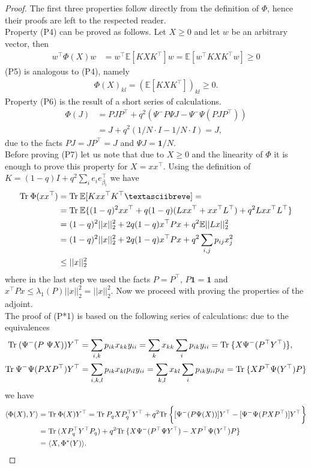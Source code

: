 \documentclass[a4paper,12pt]{article}
\def\tr{\mathrm{Tr}\hspace{0.8mm}}
\begin{document}
\begin{proof}
	The first three properties follow directly from the definition of $\Phi$, hence their proofs are left to the respected reader. \\
	Property (P4) can be proved as follows. Let $X\geq 0$ and let $w$ be an arbitrary vector, then
	\begin{align*}
		w^\top\Phi(X)w &= w^\top\mathbb E[KXK^\top] w= \mathbb E[w^\top K X K^\top w] \geq 0
	\end{align*}
	(P5) is analogous to (P4), namely
	\begin{align*}
		\Phi(X)_{kl}  = (\mathbb E[KXK^\top])_{kl}  \geq 0.
	\end{align*}
	Property (P6) is the result of a short series of calculations.
	\begin{align*}
		\Phi(J) &= PJP^\top + q^2(\Psi^- P\Psi J - \Psi^-\Psi(PJP^\top)) \\
		& = J + q^2(1/N\cdot I - 1/N\cdot I) = J,
	\end{align*}
	due to the facts $PJ = JP^\top = J$ and $\Psi J =  \mathbf1/N $. \\
	Before proving (P7) let us note that due to $X\geq0$ and the linearity of $\Phi$ it is enough to prove this property for $X=xx^\top$. Using the definition of $K = (1-q)I + q^2 \sum_i e_i e_{\beta_i}^\top$ we have
	\begin{align*}
		\tr\Phi(xx^\top)& = \tr\mathbb E[Kxx^\top K^\top ˘] =\\
		&=\tr \mathbb E\{(1-q)^2 xx^\top + q(1-q)(Lxx^\top + xx^\top L^\top) + q^2Lxx^\top L^\top \} \\
		&= (1-q)^2||x||_2^2 + 2q(1-q) x^\top P x +q^2\mathbb E ||Lx||_2^2 \\
		& = (1-q)^2||x||_2^2 + 2q(1-q) x^\top P x + q^2\sum_{i,j} p_{ij} x_j^2\\
		& \leq  ||x||^2_2
	\end{align*}
	where in the last step we used the facts $P=P^\top$, $P\mathbf 1 = \mathbf 1$ and $x^\top P x \leq \lambda_1(P) ||x||_2^2 = ||x||_2^2 $.
	Now we proceed with proving the properties of the adjoint.\\
	The proof of (P*1) is based on the following series of calculations:
	due to the equivalences
	\begin{align*}
		\tr (\Psi^-(P\ \Psi X ))  Y^\top& =  \sum_{i,k} p_{ik}x_{kk} y_{ii} = \sum_{k} x_{kk} \sum_i p_{ik}y_{ii} = \tr \{X \Psi^-(P^\top Y^\top)\} ,\\
		\tr \Psi^-\Psi(PXP^\top) Y^\top &= \sum_{i,k,l} p_{ik}x_{kl}p_{il}y_{ii} = \sum_{k,l} x_{kl} \sum_i p_{ik}y_{ii}p_{il} = \tr \{X P^\top \Psi(Y^\top) P\}
	\end{align*}
	we have
	\begin{align*}
		\langle \Phi(X), Y \rangle &= \tr \Phi(X)Y^\top = \tr P_qXP_q^\top Y^\top  + q^2\tr \bigg\{ [\Psi^-(P \Psi(X)) ] Y^\top  - [\Psi^-\Psi(PXP^\top)] Y^\top \bigg\} \\
		& = \tr (X P_q^\top Y^\top P_q) + q^2\tr  \{X \Psi^-(P^\top \Psi Y^\top) -X P^\top \Psi (Y^\top)  P\} \\
		& = \langle X,\Phi^*(Y) \rangle.
	\end{align*}
	

\end{proof}
\end{document}
